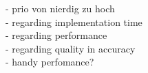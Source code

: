 - prio von nierdig zu hoch \\
- regarding implementation time \\
- regarding performance \\
- regarding quality in accuracy \\
- handy perfomance? \\
